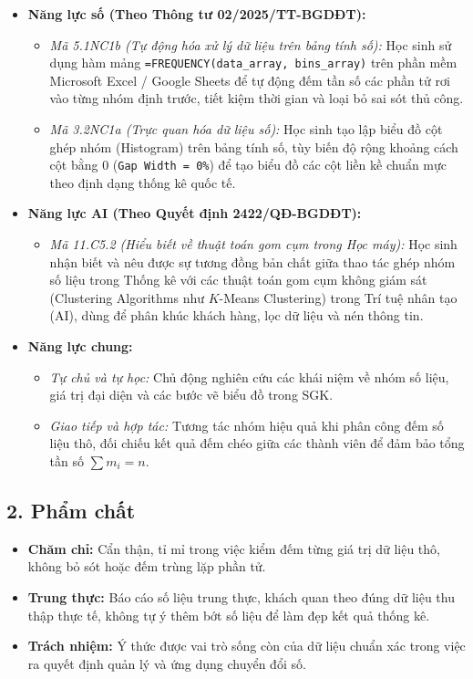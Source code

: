 \documentclass[12pt, a4paper]{article}
\begin{document}
\begin{itemize}[leftmargin=1.2cm]
    \item \textbf{Năng lực số (Theo Thông tư 02/2025/TT-BGDĐT):}
    \begin{itemize}[leftmargin=0.6cm]
        \item \textit{Mã 5.1NC1b (Tự động hóa xử lý dữ liệu trên bảng tính số):} Học sinh sử dụng hàm mảng \texttt{=FREQUENCY(data\_array, bins\_array)} trên phần mềm Microsoft Excel / Google Sheets để tự động đếm tần số các phần tử rơi vào từng nhóm định trước, tiết kiệm thời gian và loại bỏ sai sót thủ công.
        \item \textit{Mã 3.2NC1a (Trực quan hóa dữ liệu số):} Học sinh tạo lập biểu đồ cột ghép nhóm (Histogram) trên bảng tính số, tùy biến độ rộng khoảng cách cột bằng 0 (\texttt{Gap Width = 0\%}) để tạo biểu đồ các cột liền kề chuẩn mực theo định dạng thống kê quốc tế.
    \end{itemize}

    \item \textbf{Năng lực AI (Theo Quyết định 2422/QĐ-BGDĐT):}
    \begin{itemize}[leftmargin=0.6cm]
        \item \textit{Mã 11.C5.2 (Hiểu biết về thuật toán gom cụm trong Học máy):} Học sinh nhận biết và nêu được sự tương đồng bản chất giữa thao tác ghép nhóm số liệu trong Thống kê với các thuật toán gom cụm không giám sát (Clustering Algorithms như $K$-Means Clustering) trong Trí tuệ nhân tạo (AI), dùng để phân khúc khách hàng, lọc dữ liệu và nén thông tin.
    \end{itemize}

    \item \textbf{Năng lực chung:}
    \begin{itemize}[leftmargin=0.6cm]
        \item \textit{Tự chủ và tự học:} Chủ động nghiên cứu các khái niệm về nhóm số liệu, giá trị đại diện và các bước vẽ biểu đồ trong SGK.
        \item \textit{Giao tiếp và hợp tác:} Tương tác nhóm hiệu quả khi phân công đếm số liệu thô, đối chiếu kết quả đếm chéo giữa các thành viên để đảm bảo tổng tần số $\sum m_i = n$.
    \end{itemize}
\end{itemize}

\subsection*{2. Phẩm chất}

\begin{itemize}[leftmargin=1.2cm]
    \item \textbf{Chăm chỉ:} Cẩn thận, tỉ mỉ trong việc kiểm đếm từng giá trị dữ liệu thô, không bỏ sót hoặc đếm trùng lặp phần tử.
    \item \textbf{Trung thực:} Báo cáo số liệu trung thực, khách quan theo đúng dữ liệu thu thập thực tế, không tự ý thêm bớt số liệu để làm đẹp kết quả thống kê.
    \item \textbf{Trách nhiệm:} Ý thức được vai trò sống còn của dữ liệu chuẩn xác trong việc ra quyết định quản lý và ứng dụng chuyển đổi số.
\end{itemize}
\end{document}
